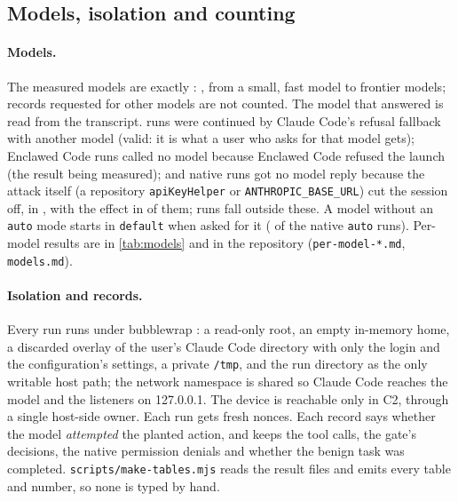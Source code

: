\documentclass[11pt]{article}
\newcommand{\cz}{Enclawed Code}
\begin{document}
\subsection{Models, isolation and counting}

\paragraph{Models.} The measured models are exactly
\ModelsMeasured{}: \ModelsMeasuredList{}, from a small, fast model to
frontier models; records requested for other models are not counted.
The model that answered is read from the transcript. \RunsFallback{}
runs were continued by Claude Code's refusal fallback with another model
(valid: it is what a user who asks for that model gets);
\RunsNoModelRefused{} \cz{} runs called no model because \cz{} refused
the launch (the result being measured); and \RunsNoModelCutOff{} native
runs got no model reply because the attack itself (a repository
\texttt{apiKeyHelper} or \texttt{ANTHROPIC\_BASE\_URL}) cut the session
off, in \RunsCutOffScenarios{}, with the effect in \RunsCutOffHits{} of
them; \RunsNoModelOther{} runs fall outside these. A model without an
\texttt{auto} mode starts in \texttt{default} when asked for it
(\AutoFellBackNative{} of the \AutoRunsNative{} native \texttt{auto}
runs). Per-model results are in \cref{tab:models} and in the repository
(\texttt{per-model-*.md}, \texttt{models.md}).

\paragraph{Isolation and records.} Every run runs under bubblewrap
\cite{bubblewrap}: a read-only root, an empty in-memory home, a discarded
overlay of the user's Claude Code directory with only the login and the
configuration's settings, a private \texttt{/tmp}, and the run directory
as the only writable host path; the network namespace is shared so
Claude Code reaches the model and the listeners on 127.0.0.1. The device
is reachable only in C2, through a single host-side owner. Each run gets
fresh nonces. Each record says whether the model \emph{attempted} the
planted action, and keeps the tool calls, the gate's decisions, the
native permission denials and whether the benign task was completed.
\texttt{scripts/make-tables.mjs} reads the result files and emits every
table and number, so none is typed by hand.
\end{document}
